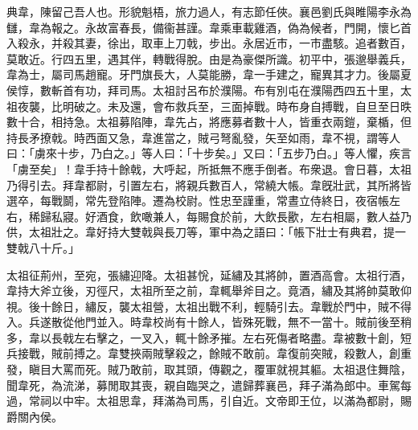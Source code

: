 \begin{pinyinscope}
 
 
 典韋，陳留己吾人也。形貌魁梧，旅力過人，有志節任俠。襄邑劉氏與睢陽李永為讎，韋為報之。永故富春長，備衞甚謹。韋乘車載雞酒，偽為候者，門開，懷匕首入殺永，并殺其妻，徐出，取車上刀戟，步出。永居近巿，一巿盡駭。追者數百，莫敢近。行四五里，遇其伴，轉戰得脫。由是為豪傑所識。初平中，張邈舉義兵，韋為士，屬司馬趙寵。牙門旗長大，人莫能勝，韋一手建之，寵異其才力。後屬夏侯惇，數斬首有功，拜司馬。太祖討呂布於濮陽。布有別屯在濮陽西四五十里，太祖夜襲，比明破之。未及還，會布救兵至，三面掉戰。時布身自搏戰，自旦至日昳數十合，相持急。太祖募陷陣，韋先占，將應募者數十人，皆重衣兩鎧，棄楯，但持長矛撩戟。時西面又急，韋進當之，賊弓弩亂發，矢至如雨，韋不視，謂等人曰：「虜來十步，乃白之。」等人曰：「十步矣。」又曰：「五步乃白。」等人懼，疾言「虜至矣」！韋手持十餘戟，大呼起，所抵無不應手倒者。布衆退。會日暮，太祖乃得引去。拜韋都尉，引置左右，將親兵數百人，常繞大帳。韋旣壯武，其所將皆選卒，每戰鬬，常先登陷陣。遷為校尉。性忠至謹重，常晝立侍終日，夜宿帳左右，稀歸私寢。好酒食，飲噉兼人，每賜食於前，大飲長歠，左右相屬，數人益乃供，太祖壯之。韋好持大雙戟與長刀等，軍中為之語曰：「帳下壯士有典君，提一雙戟八十斤。」
 
 
 
 
 太祖征荊州，至宛，張繡迎降。太祖甚恱，延繡及其將帥，置酒高會。太祖行酒，韋持大斧立後，刃徑尺，太祖所至之前，韋輒舉斧目之。竟酒，繡及其將帥莫敢仰視。後十餘日，繡反，襲太祖營，太祖出戰不利，輕騎引去。韋戰於門中，賊不得入。兵遂散從他門並入。時韋校尚有十餘人，皆殊死戰，無不一當十。賊前後至稍多，韋以長戟左右擊之，一叉入，輒十餘矛摧。左右死傷者略盡。韋被數十創，短兵接戰，賊前搏之。韋雙挾兩賊擊殺之，餘賊不敢前。韋復前突賊，殺數人，創重發，瞋目大罵而死。賊乃敢前，取其頭，傳觀之，覆軍就視其軀。太祖退住舞陰，聞韋死，為流涕，募閒取其喪，親自臨哭之，遣歸葬襄邑，拜子滿為郎中。車駕每過，常祠以中牢。太祖思韋，拜滿為司馬，引自近。文帝即王位，以滿為都尉，賜爵關內侯。
 
 
\end{pinyinscope}